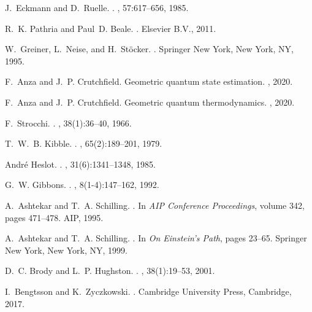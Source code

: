 \documentclass[nofootinbib,pre,twocolumn,showpacs,showkeys,groupaddress,preprintnumbers,floatfix]{revtex4-1}
\newcommand{\1}{\mathbbm{1}}
\begin{document}
\begin{thebibliography}{10}

J.~Eckmann and D.~Ruelle.
.
, 57:617--656, 1985.

R.~K. Pathria and Paul~D. Beale.
.
\newblock Elsevier B.V., 2011.

W.~Greiner, L.~Neise, and H.~St{\"{o}}cker.
.
\newblock Springer New York, New York, NY, 1995.

F.~Anza and J.~P. Crutchfield.
\newblock Geometric quantum state estimation.
, 2020.

F.~Anza and J.~P. Crutchfield.
\newblock Geometric quantum thermodynamics.
, 2020.

F.~Strocchi.
.
, 38(1):36--40, 1966.

T.~W.~B. Kibble.
.
, 65(2):189--201, 1979.

Andr{\'{e}} Heslot.
.
, 31(6):1341--1348, 1985.

G.~W. Gibbons.
.
, 8(1-4):147--162, 1992.

A.~Ashtekar and T.~A. Schilling.
.
\newblock In {\em AIP Conference Proceedings}, volume 342, pages 471--478. AIP,
  1995.

A.~Ashtekar and T.~A. Schilling.
.
\newblock In {\em On Einstein's Path}, pages 23--65. Springer New York, New
  York, NY, 1999.

D.~C. Brody and L.~P. Hughston.
.
, 38(1):19--53, 2001.

I.~Bengtsson and K.~Zyczkowski.
.
\newblock Cambridge University Press, Cambridge, 2017.


\end{thebibliography}
\end{document}
